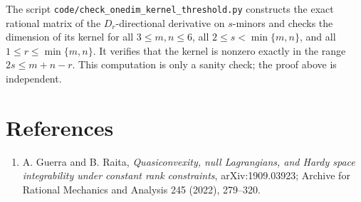 \documentclass[11pt]{article}
\begin{document}
The script \texttt{code/check\_onedim\_kernel\_threshold.py} constructs the
exact rational matrix of the $D_r$-directional derivative on $s$-minors and
checks the dimension of its kernel for all $3\le m,n\le6$, all
$2\le s<\min\{m,n\}$, and all $1\le r\le\min\{m,n\}$. It verifies that the
kernel is nonzero exactly in the range $2s\le m+n-r$. This computation is only
a sanity check; the proof above is independent.

\section*{References}

\begin{enumerate}
\item A. Guerra and B. Raita,
\emph{Quasiconvexity, null Lagrangians, and Hardy space integrability under
constant rank constraints}, arXiv:1909.03923; Archive for Rational Mechanics
and Analysis 245 (2022), 279--320.
\end{enumerate}
\end{document}
